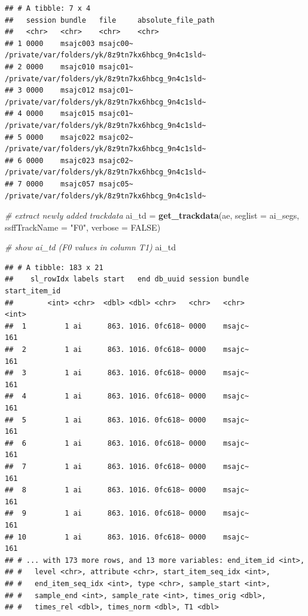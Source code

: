 \documentclass[]{book}
\newenvironment{Shaded}{\begin{snugshade}}{\end{snugshade}}
\newcommand{\CommentTok}[1]{\textcolor[rgb]{0.56,0.35,0.01}{\textit{#1}}}
\newcommand{\DataTypeTok}[1]{\textcolor[rgb]{0.13,0.29,0.53}{#1}}
\newcommand{\KeywordTok}[1]{\textcolor[rgb]{0.13,0.29,0.53}{\textbf{#1}}}
\newcommand{\NormalTok}[1]{#1}
\newcommand{\OtherTok}[1]{\textcolor[rgb]{0.56,0.35,0.01}{#1}}
\newcommand{\StringTok}[1]{\textcolor[rgb]{0.31,0.60,0.02}{#1}}
\begin{document}
\begin{verbatim}
## # A tibble: 7 x 4
##   session bundle   file     absolute_file_path                             
##   <chr>   <chr>    <chr>    <chr>                                          
## 1 0000    msajc003 msajc00~ /private/var/folders/yk/8z9tn7kx6hbcg_9n4c1sld~
## 2 0000    msajc010 msajc01~ /private/var/folders/yk/8z9tn7kx6hbcg_9n4c1sld~
## 3 0000    msajc012 msajc01~ /private/var/folders/yk/8z9tn7kx6hbcg_9n4c1sld~
## 4 0000    msajc015 msajc01~ /private/var/folders/yk/8z9tn7kx6hbcg_9n4c1sld~
## 5 0000    msajc022 msajc02~ /private/var/folders/yk/8z9tn7kx6hbcg_9n4c1sld~
## 6 0000    msajc023 msajc02~ /private/var/folders/yk/8z9tn7kx6hbcg_9n4c1sld~
## 7 0000    msajc057 msajc05~ /private/var/folders/yk/8z9tn7kx6hbcg_9n4c1sld~
\end{verbatim}

\begin{Shaded}
\begin{Highlighting}[]
\CommentTok{# extract newly added trackdata}
\NormalTok{ai_td =}\StringTok{ }\KeywordTok{get_trackdata}\NormalTok{(ae,}
                      \DataTypeTok{seglist =}\NormalTok{ ai_segs,}
                      \DataTypeTok{ssffTrackName =} \StringTok{"F0"}\NormalTok{,}
                      \DataTypeTok{verbose =} \OtherTok{FALSE}\NormalTok{)}

\CommentTok{# show ai_td (F0 values in column T1)}
\NormalTok{ai_td}
\end{Highlighting}
\end{Shaded}

\begin{verbatim}
## # A tibble: 183 x 21
##    sl_rowIdx labels start   end db_uuid session bundle start_item_id
##        <int> <chr>  <dbl> <dbl> <chr>   <chr>   <chr>          <int>
##  1         1 ai      863. 1016. 0fc618~ 0000    msajc~           161
##  2         1 ai      863. 1016. 0fc618~ 0000    msajc~           161
##  3         1 ai      863. 1016. 0fc618~ 0000    msajc~           161
##  4         1 ai      863. 1016. 0fc618~ 0000    msajc~           161
##  5         1 ai      863. 1016. 0fc618~ 0000    msajc~           161
##  6         1 ai      863. 1016. 0fc618~ 0000    msajc~           161
##  7         1 ai      863. 1016. 0fc618~ 0000    msajc~           161
##  8         1 ai      863. 1016. 0fc618~ 0000    msajc~           161
##  9         1 ai      863. 1016. 0fc618~ 0000    msajc~           161
## 10         1 ai      863. 1016. 0fc618~ 0000    msajc~           161
## # ... with 173 more rows, and 13 more variables: end_item_id <int>,
## #   level <chr>, attribute <chr>, start_item_seq_idx <int>,
## #   end_item_seq_idx <int>, type <chr>, sample_start <int>,
## #   sample_end <int>, sample_rate <int>, times_orig <dbl>,
## #   times_rel <dbl>, times_norm <dbl>, T1 <dbl>
\end{verbatim}
\end{document}

